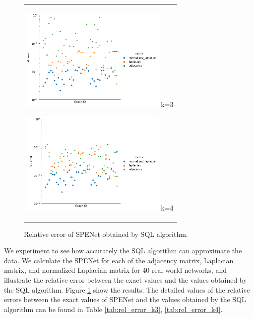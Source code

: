 \documentclass[senior,final,11pt]{iscs-thesis}
\begin{document}
\begin{figure}[htbp]
    \begin{center}
      \begin{tabular}{c}
        \begin{minipage}{0.5\hsize}
          \begin{center}
            \includegraphics[clip, width=7cm]{./figure/plot_each_graph_k3.png}
            \hspace{1.6cm} k=3
          \end{center}
        \end{minipage}
        \begin{minipage}{0.5\hsize}
          \begin{center}
            \includegraphics[clip, width=7cm]{./figure/plot_each_graph_k4.png}
            \hspace{1.6cm} k=4
          \end{center}
        \end{minipage}

      \end{tabular}
      \caption{Relative error of SPENet obtained by SQL algorithm.}
      \label{fig:error_each_graph}
    \end{center}
  \end{figure}

We experiment to see how accurately the SQL algorithm can approximate the data. We calculate the SPENet for each of the adjacency matrix, Laplacian matrix, and normalized Laplacian matrix for 40 real-world networks, and illustrate the relative error between the exact values and the values obtained by the SQL algorithm. Figure \ref{fig:error_each_graph} show the results. The detailed values of the relative errors between the exact values of SPENet and the values obtained by the SQL algorithm can be found in Table \ref{tab:rel_error_k3}, \ref{tab:rel_error_k4}.
\end{document}
